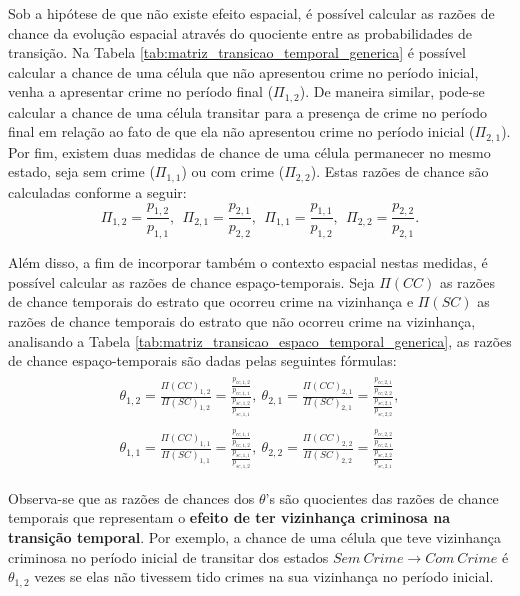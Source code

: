 \documentclass[12pt,openright,oneside,a4paper,english,french,spanish]{abntex2}
\numberwithin{table}{section} %
\numberwithin{figure}{section} %
\begin{document}
Sob a hipótese de que não existe efeito espacial, é possível calcular as razões de chance da evolução espacial através do quociente entre as probabilidades de transição. Na Tabela \ref{tab:matriz_transicao_temporal_generica} é possível calcular a chance de uma célula que não apresentou crime no período inicial, venha a apresentar crime no período final ($\Pi_{1,2}$). De maneira similar, pode-se calcular a chance de uma célula transitar para a presença de crime no período final em relação ao fato de que ela não apresentou crime no período inicial ($\Pi_{2,1}$). Por fim, existem duas medidas de chance de uma célula permanecer no mesmo estado, seja sem crime ($\Pi_{1,1}$) ou com crime ($\Pi_{2,2}$). Estas razões de chance são calculadas conforme a seguir:
\begin{equation}
\Pi_{1,2}=\frac{p_{1,2}}{p_{1,1}},\ \ \Pi_{2,1}=\frac{p_{2,1}}{p_{2,2}}, \ \ \Pi_{1,1}=\frac{p_{1,1}}{p_{1,2}}, \ \ \Pi_{2,2}=\frac{p_{2,2}}{p_{2,1}}.
\label{eq:odds_temporal}
\end{equation}

Além disso, a fim de incorporar também o contexto espacial nestas medidas, é possível calcular as razões de chance espaço-temporais. Seja $\Pi(CC)$ as razões de chance temporais do estrato que ocorreu crime na vizinhança e $\Pi(SC)$ as razões de chance temporais do estrato que não ocorreu crime na vizinhança, analisando a Tabela \ref{tab:matriz_transicao_espaco_temporal_generica}, as razões de chance espaço-temporais são dadas pelas seguintes fórmulas:
\begin{align}
\begin{split} %
\theta_{1,2}=\frac{\Pi(CC)_{1,2}}{\Pi(SC)_{1,2}}=\frac{\frac{p_{cc,1,2}}{p_{cc,1,1}}}{\frac{p_{sc,1,2}}{p_{sc,1,1}}}, \ \theta_{2,1}=\frac{\Pi(CC)_{2,1}}{\Pi(SC)_{2,1}}=\frac{\frac{p_{cc,2,1}}{p_{cc,2,2}}}{\frac{p_{sc,2,1}}{p_{sc,2,2}}}, \\ \\ \theta_{1,1}=\frac{\Pi(CC)_{1,1}}{\Pi(SC)_{1,1}}=\frac{\frac{p_{cc,1,1}}{p_{cc,1,2}}}{\frac{p_{sc,1,1}}{p_{sc,1,2}}}, \ \theta_{2,2}=\frac{\Pi(CC)_{2,2}}{\Pi(SC)_{2,2}}=\frac{\frac{p_{cc,2,2}}{p_{cc,2,1}}}{\frac{p_{sc,2,2}}{p_{sc,2,1}}}
\label{eq:odds_ratio_espaco_temporal}
\end{split}
\end{align}

Observa-se que as razões de chances dos $\theta$'s são quocientes das razões de chance temporais que representam o \textbf{efeito de ter vizinhança criminosa na transição temporal}. Por exemplo, a chance de uma célula que teve vizinhança criminosa no período inicial de transitar dos estados $Sem \ Crime \rightarrow Com \ Crime$ é $\theta_{1,2}$ vezes se elas não tivessem tido crimes na sua vizinhança no período inicial.
\end{document}
